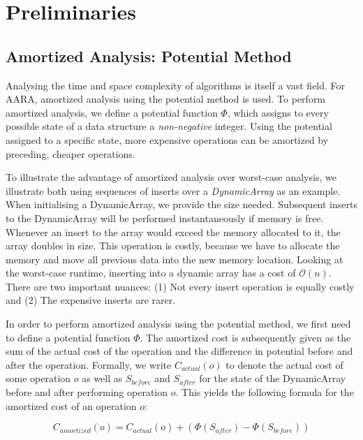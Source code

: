 \chapter{Preliminaries} \label{chap:preliminaries}

\section{Amortized Analysis: Potential Method}
Analysing the time and space complexity of algorithms is itself a vast field. For AARA, amortized analysis using the potential method is used. To perform amortized analysis, we define a potential function \(\Phi\), which assigns to every possible state of a data structure a \emph{non-negative} integer. Using the potential assigned to a specific state, more expensive operations can be amortized by preceding, cheaper operations.

To illustrate the advantage of amortized analysis over worst-case analysis, we illustrate both using sequences of inserts over a \emph{DynamicArray} as an example. When initialising a DynamicArray, we provide the size needed. Subsequent inserts to the DynamicArray will be performed instantaneously if memory is free. Whenever an insert to the array would exceed the memory allocated to it, the array doubles in size.
This operation is costly, because we have to allocate the memory and move all previous data into the new memory location. Looking at the worst-case runtime, inserting into a dynamic array has a cost of \(\mathcal{O}(n)\). There are two important nuances: (1) Not every insert operation is equally costly and (2) The expensive inserts are rarer.

In order to perform amortized analysis using the potential method, we first need to define a potential function \(\Phi\). The amortized cost is subsequently given as the sum of the actual cost of the operation and the difference in potential before and after the operation. Formally, we write \(C_{actual}(o)\) to denote the actual cost of some operation \(o\) as well as \(S_{before}\) and \(S_{after}\) for the state of the DynamicArray before and after performing operation \(o\). This yields the following formula for the amortized cost of an operation \(o\):

\[C_{amortized}(o) = C_{actual}(o) + (\Phi(S_{after}) - \Phi(S_{before}))\]
\label{eq:amortized-cost}

